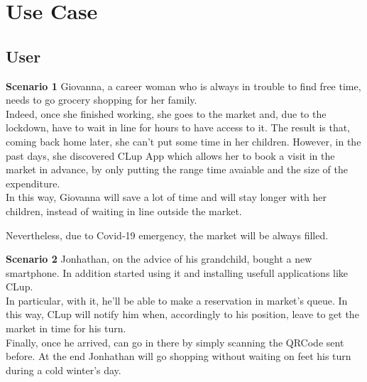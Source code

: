 \pagebreak

\section{Use Case}
\bigbreak
\subsection{User}
\bigbreak
\bigbreak

{\normalsize \textbf{Scenario 1}}
Giovanna, a career woman who is always in trouble to find free time, needs to go grocery shopping for her family.\\ 
Indeed, once she finished working, she goes to the market and, due to the lockdown, have to wait in line for hours to have access to it. The result is that, coming back home later, she can't put some time in her children.
However, in the past days, she discovered CLup App which allows her to book a visit in the market in advance, by only putting the range time avaiable and the size of the expenditure.\\
In this way, Giovanna will save a lot of time and will stay longer with her children, instead of waiting in line outside the market.

Nevertheless, due to Covid-19 emergency, the market will be always filled.

\par \medskip


{\normalsize \textbf{Scenario 2}} Jonhathan, on the advice of his grandchild, bought a new smartphone.  In addition started using it and installing usefull applications like CLup.\\
In particular, with it, he'll be able to make a reservation in market's queue. In this way, CLup will notify him when, accordingly to his position, leave to get the market in time for his turn.\\
Finally, once he arrived, can go in there by simply scanning the QRCode sent before. 
At the end Jonhathan will go shopping without waiting on feet his turn during a cold winter's day.

